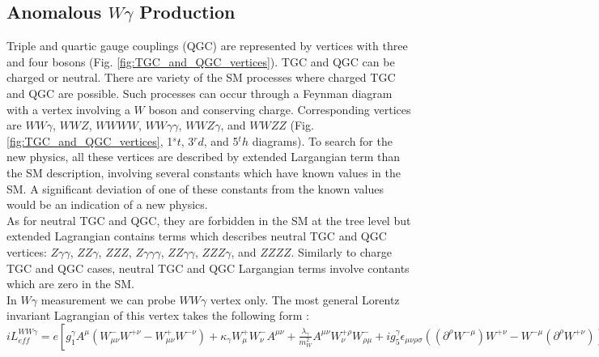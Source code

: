 \subsection{Anomalous $W\gamma$ Production}
\label{sec:WgAbout_ATGC}

Triple and quartic gauge couplings (QGC) are represented by vertices with three and four bosons (Fig. \ref{fig:TGC_and_QGC_vertices}). TGC and QGC can be charged or neutral. There are variety of the SM processes where charged TGC and QGC are possible. Such processes can occur through a Feynman diagram with a vertex involving a $W$ boson and conserving charge. Corresponding vertices are $WW\gamma$, $WWZ$, $WWWW$, $WW\gamma\gamma$, $WWZ\gamma$, and $WWZZ$ (Fig. \ref{fig:TGC_and_QGC_vertices}, 1$^st$, 3$^rd$, and 5$^th$ diagrams). To search for the new physics, all these vertices are described by extended Largangian term than the SM description, involving several constants which have known values in the SM. A significant deviation of one of these constants from the known values would be an indication of a new physics.\\

As for neutral TGC and QGC, they are forbidden in the SM at the tree level but extended Lagrangian contains terms which describes neutral TGC and QGC vertices: $Z\gamma\gamma$, $ZZ\gamma$, $ZZZ$, $Z\gamma\gamma\gamma$, $ZZ\gamma\gamma$, $ZZZ\gamma$, and $ZZZZ$. Similarly to charge TGC and QGC cases, neutral TGC and QGC Largangian terms involve contants which are zero in the SM.\\  





In $W\gamma$ measurement we can probe $WW\gamma$ vertex only. The most general Lorentz invariant Lagrangian of this vertex takes the following form \cite{ref_theory_aTGC}:\\

$i L_{eff}^{WW\gamma}= e [ g_1^{\gamma} A^\mu (W_{\mu\nu}^- W^{+\nu} - W_{\mu\nu}^+ W^{-\nu}) + \kappa_\gamma W_{\mu}^+ W_{\nu}^- A^{\mu\nu} + {\frac{\lambda_\gamma}{m^2_W}} A^{\mu\nu} W_\nu^{+\rho} W_{\rho\mu}^- + i g_5^\gamma \epsilon_{\mu\nu\rho\sigma}((\partial^\rho W^{-\mu})W^{+\nu} - W^{-\mu}(\partial^{\rho}W^{+\nu}))V^\sigma + i g_4^\gamma W_\mu^- W_\nu^+ (\partial^\mu A^\nu + \partial^\nu A^\mu) - \frac{\tilde{\kappa_\gamma}}{2} W_\mu^- W_\nu^+ \epsilon^{\mu\nu\rho\sigma} A_{\rho\sigma} - \frac{\tilde{\lambda_\gamma}}{2 m_W^2} W_{\rho\mu}^- W^{+\mu}_{\nu} \epsilon^{\nu\rho\alpha\beta} A_{\alpha\beta}] $\\


